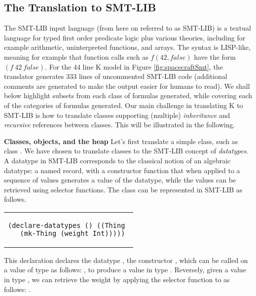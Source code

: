 \subsection{The Translation to SMT-LIB}

The SMT-LIB input language (from here on referred to as SMT-LIB) is a
textual language for typed first order predicate logic plus various
theories, including for example arithmetic, uninterpreted functions,
and arrays. The syntax is LISP-like, meaning for example that function
calls such as $f(42,false)$ have the form $(f\ 42\ false)$. For the 44
line K model in Figure \ref{fig:spacecraftSmt}, the translator
generates 333 lines of uncommented SMT-LIB code (additional comments
are generated to make the output easier for humans to read). We shall
below highlight subsets from each class of formulas generated, while
covering each of the categories of formulas generated. Our main challenge
in translating K to SMT-LIB is how to translate classes 
supporting (multiple) {\em inheritance} and {\em recursive} references
between classes. This will be illustrated in the following.

\textbf{Classes, objects, and the heap} Let's first translate a simple
class, such as class .  We have chosen to translate
classes to the SMT-LIB concept of {\em datatypes}. A datatype in
SMT-LIB corresponds to the classical notion of an algebraic datatype:
a named record, with a constructor function that when applied to a
sequence of values generates a value of the datatype, while the values
can be retrieved using selector functions.  The class 
can be represented in SMT-LIB as follows.

\lstset{language=SMT,numbers=none}

\begin{center}
\begin{tabular}{c}
\small
\begin{lstlisting}
(declare-datatypes () ((Thing 
  (mk-Thing (weight Int)))))
\end{lstlisting}
\end{tabular}
\end{center}

\noindent This declaration declares the datatype , the
constructor , which can be called on a value 
of type  as follows: , to produce a
value in type . Reversely, given a value  in type
, we can retrieve the weight by applying the selector
function  to  as follows: .

